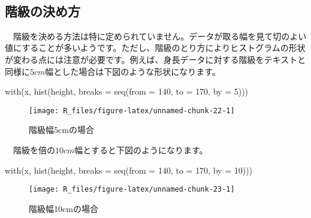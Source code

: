 \documentclass[
  12pt,
]{book}
\newenvironment{Shaded}{\begin{snugshade}}{\end{snugshade}}
\newcommand{\AttributeTok}[1]{\textcolor[rgb]{0.77,0.63,0.00}{#1}}
\newcommand{\DecValTok}[1]{\textcolor[rgb]{0.00,0.00,0.81}{#1}}
\newcommand{\FunctionTok}[1]{\textcolor[rgb]{0.00,0.00,0.00}{#1}}
\newcommand{\NormalTok}[1]{#1}
\begin{document}
　

\hypertarget{ux968eux7d1aux306eux6c7aux3081ux65b9}{%
\subsection*{階級の決め方}\label{ux968eux7d1aux306eux6c7aux3081ux65b9}}

　階級を決める方法は特に定められていません。データが取る幅を見て切のよい値にすることが多いようです。ただし、階級のとり方によりヒストグラムの形状が変わる点には注意が必要です。例えば、身長データに対する階級をテキストと同様に\(5cm\)幅とした場合は下図のような形状になります。

\begin{Shaded}
\begin{Highlighting}[]
\FunctionTok{with}\NormalTok{(x, }\FunctionTok{hist}\NormalTok{(height, }\AttributeTok{breaks =} \FunctionTok{seq}\NormalTok{(}\AttributeTok{from =} \DecValTok{140}\NormalTok{, }\AttributeTok{to =} \DecValTok{170}\NormalTok{, }\AttributeTok{by =} \DecValTok{5}\NormalTok{)))}
\end{Highlighting}
\end{Shaded}

\begin{figure}[H]

{\centering \texttt{[image: R\_files/figure-latex/unnamed-chunk-22-1]} 

}

\caption{階級幅5cmの場合}\label{fig:unnamed-chunk-22}
\end{figure}

　階級を倍の\(10cm\)幅とすると下図のようになります。

\begin{Shaded}
\begin{Highlighting}[]
\FunctionTok{with}\NormalTok{(x, }\FunctionTok{hist}\NormalTok{(height, }\AttributeTok{breaks =} \FunctionTok{seq}\NormalTok{(}\AttributeTok{from =} \DecValTok{140}\NormalTok{, }\AttributeTok{to =} \DecValTok{170}\NormalTok{, }\AttributeTok{by =} \DecValTok{10}\NormalTok{)))}
\end{Highlighting}
\end{Shaded}

\begin{figure}[H]

{\centering \texttt{[image: R\_files/figure-latex/unnamed-chunk-23-1]} 

}

\caption{階級幅10cmの場合}\label{fig:unnamed-chunk-23}
\end{figure}
\end{document}
